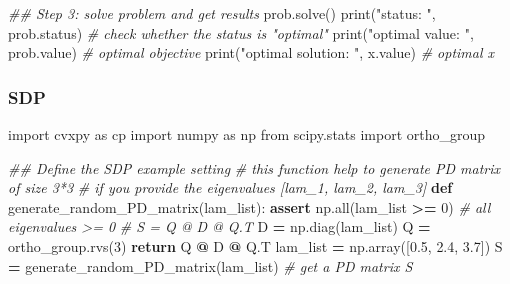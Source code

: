 \documentclass[
]{book}
\newenvironment{Shaded}{\begin{snugshade}}{\end{snugshade}}
\newcommand{\BuiltInTok}[1]{#1}
\newcommand{\CommentTok}[1]{\textcolor[rgb]{0.56,0.35,0.01}{\textit{#1}}}
\newcommand{\ControlFlowTok}[1]{\textcolor[rgb]{0.13,0.29,0.53}{\textbf{#1}}}
\newcommand{\DecValTok}[1]{\textcolor[rgb]{0.00,0.00,0.81}{#1}}
\newcommand{\FloatTok}[1]{\textcolor[rgb]{0.00,0.00,0.81}{#1}}
\newcommand{\ImportTok}[1]{#1}
\newcommand{\KeywordTok}[1]{\textcolor[rgb]{0.13,0.29,0.53}{\textbf{#1}}}
\newcommand{\NormalTok}[1]{#1}
\newcommand{\OperatorTok}[1]{\textcolor[rgb]{0.81,0.36,0.00}{\textbf{#1}}}
\newcommand{\StringTok}[1]{\textcolor[rgb]{0.31,0.60,0.02}{#1}}
\theoremstyle{definition}
\theoremstyle{definition}
\theoremstyle{definition}
\theoremstyle{definition}
\theoremstyle{remark}
\begin{document}
\begin{Shaded}
\begin{Highlighting}[]
\CommentTok{\#\# Step 3: solve problem and get results}
\NormalTok{prob.solve()  }
\BuiltInTok{print}\NormalTok{(}\StringTok{"status: "}\NormalTok{, prob.status) }\CommentTok{\# check whether the status is "optimal"}
\BuiltInTok{print}\NormalTok{(}\StringTok{"optimal value: "}\NormalTok{, prob.value) }\CommentTok{\# optimal objective}
\BuiltInTok{print}\NormalTok{(}\StringTok{"optimal solution: "}\NormalTok{, x.value) }\CommentTok{\# optimal x}
\end{Highlighting}
\end{Shaded}

\hypertarget{sdp}{%
\subsubsection{SDP}\label{sdp}}

\begin{Shaded}
\begin{Highlighting}[]
\ImportTok{import}\NormalTok{ cvxpy }\ImportTok{as}\NormalTok{ cp}
\ImportTok{import}\NormalTok{ numpy }\ImportTok{as}\NormalTok{ np}
\ImportTok{from}\NormalTok{ scipy.stats }\ImportTok{import}\NormalTok{ ortho\_group}

\CommentTok{\#\# Define the SDP example setting}
\CommentTok{\# this function help to generate PD matrix of size 3*3 }
\CommentTok{\# if you provide the eigenvalues [lam\_1, lam\_2, lam\_3]}
\KeywordTok{def}\NormalTok{ generate\_random\_PD\_matrix(lam\_list):}
    \ControlFlowTok{assert}\NormalTok{ np.}\BuiltInTok{all}\NormalTok{(lam\_list }\OperatorTok{\textgreater{}=} \DecValTok{0}\NormalTok{) }\CommentTok{\# all eigenvalues \textgreater{}= 0}
    \CommentTok{\# S = Q @ D @ Q.T}
\NormalTok{    D }\OperatorTok{=}\NormalTok{ np.diag(lam\_list)}
\NormalTok{    Q }\OperatorTok{=}\NormalTok{ ortho\_group.rvs(}\DecValTok{3}\NormalTok{)}
    \ControlFlowTok{return}\NormalTok{ Q }\OperatorTok{@}\NormalTok{ D }\OperatorTok{@}\NormalTok{ Q.T}
\NormalTok{lam\_list }\OperatorTok{=}\NormalTok{ np.array([}\FloatTok{0.5}\NormalTok{, }\FloatTok{2.4}\NormalTok{, }\FloatTok{3.7}\NormalTok{])}
\NormalTok{S }\OperatorTok{=}\NormalTok{ generate\_random\_PD\_matrix(lam\_list) }\CommentTok{\# get a PD matrix S}


\end{Highlighting}
\end{Shaded}
\end{document}
